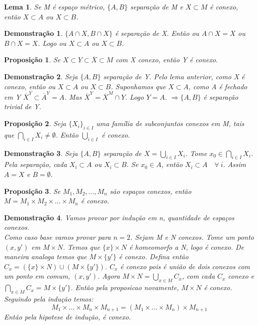 \documentclass{article}
\newtheorem*{proposicao}{Proposição}
\newtheorem*{lema}{Lema}
\newtheorem*{prova}{Demonstração}
\begin{document}
\begin{lema}
    Se M é espaço métrico, $\{A, B\}$ separação de M e $X \subset M$ é conexo, então $X \subset A$ ou $X \subset B$. 
\end{lema}

\begin{prova}
    $\{A \cap X, B \cap X\}$ é separação de X. Então ou $A \cap X = X$ ou $B \cap X = X$. Logo ou $X \subset A$ ou $X \subset B$.
\end{prova}

\begin{proposicao}
    Se $X \subset Y \subset \overline{X} \subset M$ com X conexo, então Y é conexo.
\end{proposicao}

\begin{prova}
    Seja $\{A, B\}$ separação de Y. Pelo lema anterior, como X é conexo, então ou $X \subset A$ ou $X \subset B$.
    Suponhamos que $X \subset A$, como A é fechado em Y $\overline{X}^Y \subset \overline{A}^Y = A$.
    Mas $\overline{X}^Y = \overline{X}^M \cap Y$. Logo $Y = A$.
    $\Rightarrow \{A, B\}$ é separação trivial de Y.
\end{prova}

\begin{proposicao}
    Seja $\{X_i\}_{i\in I}$ uma família de subconjuntos conexos em M,
    tais que $\bigcap_{i \in I}X_i \neq \emptyset$.
    Então $\bigcup_{i \in I}$ é conexo. 
\end{proposicao}

\begin{prova}
    Seja $\{A, B\}$ separação de $X = \bigcup_{i\in I}X_i$.
    Tome $x_0 \in \bigcap_{i \in I} X_i$.
    Pela separação, cada $X_i \subset A$ ou $X_i \subset B$.
    Se $x_0 \in A$, então $X_i \subset A \quad \forall \: i$.
    Assim $A = X$ e $B = \emptyset$.
\end{prova}

\begin{proposicao}
    Se $M_1, M_2, \dots, M_n$ são espaços conexos, então
    $M = M_1 \times M_2 \times \dots \times M_n$ é conexo. 
\end{proposicao}

\begin{prova}
    Vamos provar por indução em n, quantidade de espaços conexos.\\
    Como caso base vamos provar para $n = 2$. 
    Sejam M e N conexos. Tome um ponto $(x, y')$ em $M \times N$.
    Temos que $\{x\} \times N$ é homeomorfo a N, logo é conexo.
    De maneira analoga temos que $M \times \{y'\}$ é conexo.
    Defina então $C_x = (\{x\} \times N) \cup (M \times \{y'\})$.
    $C_x$ é conexo pois é união de dois conexos com um ponto em comum, $(x, y')$.
    Agora $M \times N = \bigcup_{x \in M} C_x$, com cada $C_x$ conexo 
    e $\bigcap_{x \in M} C_x = M \times \{y'\}$.
    Então pela proposicao novamente, $M \times N$ é conexo.
    Seguindo pela indução temos:
    \[M_1 \times \dots \times M_n \times M_{n+1} = (M_1 \times \dots \times M_n) \times M_{n+1}\]
    Então pela hipotese de indução, é conexo.
\end{prova}
\end{document}
